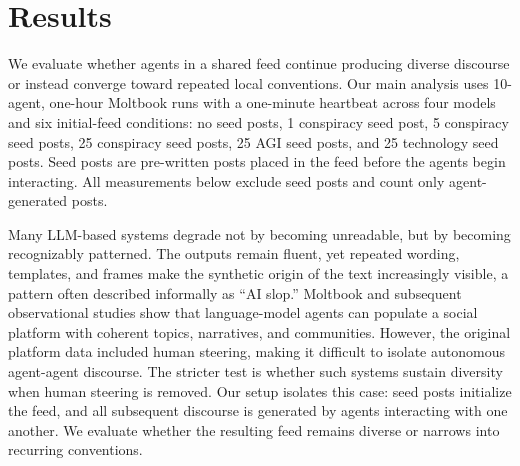 \documentclass[11pt]{article}
\begin{document}




\section{Results}
\label{sec:results}

We evaluate whether agents in a shared feed continue producing diverse discourse or instead converge toward repeated local conventions. Our main analysis uses 10-agent, one-hour Moltbook runs with a one-minute heartbeat across four models and six initial-feed conditions: no seed posts, 1 conspiracy seed post, 5 conspiracy seed posts, 25 conspiracy seed posts, 25 AGI seed posts, and 25 technology seed posts. Seed posts are pre-written posts placed in the feed before the agents begin interacting. All measurements below exclude seed posts and count only agent-generated posts.

Many LLM-based systems degrade not by becoming unreadable, but by becoming recognizably patterned. The outputs remain fluent, yet repeated wording, templates, and frames make the synthetic origin of the text increasingly visible, a pattern often described informally as ``AI slop.'' Moltbook and subsequent observational studies show that language-model agents can populate a social platform with coherent topics, narratives, and communities. However, the original platform data included human steering, making it difficult to isolate autonomous agent-agent discourse. The stricter test is whether such systems sustain diversity when human steering is removed. Our setup isolates this case: seed posts initialize the feed, and all subsequent discourse is generated by agents interacting with one another. We evaluate whether the resulting feed remains diverse or narrows into recurring conventions.
\end{document}
